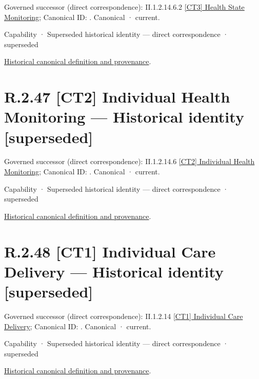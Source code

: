 {\small Governed successor (direct correspondence): II.1.2.14.6.2 \hyperref[element:d77f22909f8b47dba4cbd95982e576df]{[CT3] Health State Monitoring}; Canonical ID: \texttt{}. Canonical · current.}\par
\label{element:346f024f74b447a8b6056b9d521837ff}
{\small Capability · Superseded historical identity — direct correspondence · superseded}\par
\href{../../../../continuum/strategy/capability/346f024f74b447a8b6056b9d521837ff.md}{Historical canonical definition and provenance}.\par
\section*{R.2.47 [CT2] Individual Health Monitoring — Historical identity [superseded]}
\label{navigation:R.2.47}

{\small Governed successor (direct correspondence): II.1.2.14.6 \hyperref[element:c7d0e498e1ad44138df940af2f91cd2d]{[CT2] Individual Health Monitoring}; Canonical ID: \texttt{}. Canonical · current.}\par
\label{element:31e7c27556314cafb74d040441d2dac6}
{\small Capability · Superseded historical identity — direct correspondence · superseded}\par
\href{../../../../continuum/strategy/capability/31e7c27556314cafb74d040441d2dac6.md}{Historical canonical definition and provenance}.\par
\section*{R.2.48 [CT1] Individual Care Delivery — Historical identity [superseded]}
\label{navigation:R.2.48}

{\small Governed successor (direct correspondence): II.1.2.14 \hyperref[element:b964a11cde594318aa14ff935414158a]{[CT1] Individual Care Delivery}; Canonical ID: \texttt{}. Canonical · current.}\par
\label{element:162deb7e292042f78f677a14476a3a1d}
{\small Capability · Superseded historical identity — direct correspondence · superseded}\par
\href{../../../../continuum/strategy/capability/162deb7e292042f78f677a14476a3a1d.md}{Historical canonical definition and provenance}.\par
